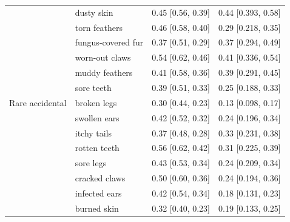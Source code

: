\documentclass[12pt,letterpaper]{article}
\begin{document}
\begin{table}[h]
\begin{tabular}{| l || l | l | l |}
                  & dusty skin         & 0.45 {[}0.56, 0.39{]}   & 0.44 {[}0.393, 0.58{]}       \\
                  & torn feathers      & 0.46 {[}0.58, 0.40{]}   & 0.29 {[}0.218, 0.35{]}       \\
                  & fungus-covered fur & 0.37 {[}0.51, 0.29{]}   & 0.37 {[}0.294, 0.49{]}       \\
                  & worn-out claws     & 0.54 {[}0.62, 0.46{]}   & 0.41 {[}0.336, 0.54{]}       \\
                  & muddy feathers     & 0.41 {[}0.58, 0.36{]}   & 0.39 {[}0.291, 0.45{]}       \\
                  & sore teeth         & 0.39 {[}0.51, 0.33{]}   & 0.25 {[}0.188, 0.33{]}       \\
Rare accidental   & broken legs        & 0.30 {[}0.44, 0.23{]}   & 0.13 {[}0.098, 0.17{]}       \\
                  & swollen ears       & 0.42 {[}0.52, 0.32{]}   & 0.24 {[}0.196, 0.34{]}       \\
                  & itchy tails        & 0.37 {[}0.48, 0.28{]}   & 0.33 {[}0.231, 0.38{]}       \\
                  & rotten teeth       & 0.56 {[}0.62, 0.42{]}   & 0.31 {[}0.225, 0.39{]}       \\
                  & sore legs          & 0.43 {[}0.53, 0.34{]}   & 0.24 {[}0.209, 0.34{]}       \\
                  & cracked claws      & 0.50 {[}0.60, 0.36{]}   & 0.24 {[}0.194, 0.36{]}       \\
                  & infected ears      & 0.42 {[}0.54, 0.34{]}   & 0.18 {[}0.131, 0.23{]}       \\
                  & burned skin        & 0.32 {[}0.40, 0.23{]}   & 0.19 {[}0.133, 0.25{]}      \\
                         \hline

\end{tabular}
\end{table}
    
\end{document}
